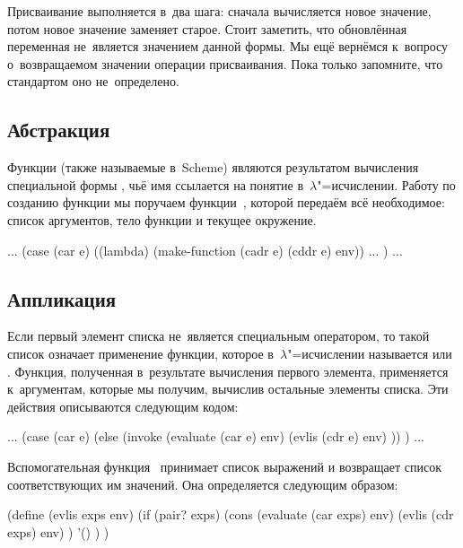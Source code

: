 Присваивание выполняется в~два шага: сначала вычисляется новое значение, потом
новое значение заменяет старое. Стоит заметить, что обновлённая переменная
не~является значением данной формы. Мы ещё вернёмся к~вопросу о~возвращаемом
значении операции присваивания.  Пока только
запомните, что стандартом оно не~определено.


\subsection{Абстракция}\label{basics/evaluating-forms/ssect:abstraction}

Функции (также называемые  в~Scheme) являются результатом
вычисления специальной формы , чьё имя ссылается на понятие
 в~$\lambda$"=исчислении. Работу по созданию функции мы
поручаем функции~, которой передаём всё необходимое: список
аргументов, тело функции и текущее окружение.

\begin{code:lisp}
... (case (car e)
      ((lambda) (make-function (cadr e) (cddr e) env)) ... ) ...
\end{code:lisp}


\subsection{Аппликация}\label{basics/evaluating-forms/ssect:application}

Если первый элемент списка не~является специальным оператором, то такой список
означает применение функции, которое в~$\lambda$"=исчислении называется
 или . Функция, полученная в~результате
вычисления первого элемента, применяется к~аргументам, которые мы получим,
вычислив остальные элементы списка. Эти действия описываются следующим кодом:

\begin{code:lisp}
... (case (car e)
      (else (invoke (evaluate (car e) env)
                    (evlis (cdr e) env) )) ) ...
\end{code:lisp}

Вспомогательная функция~ принимает список выражений и возвращает
список соответствующих им значений. Она определяется следующим образом:

\begin{code:lisp}
(define (evlis exps env)
  (if (pair? exps)
      (cons (evaluate (car exps) env)
            (evlis (cdr exps) env) )
      '() ) )
\end{code:lisp}


